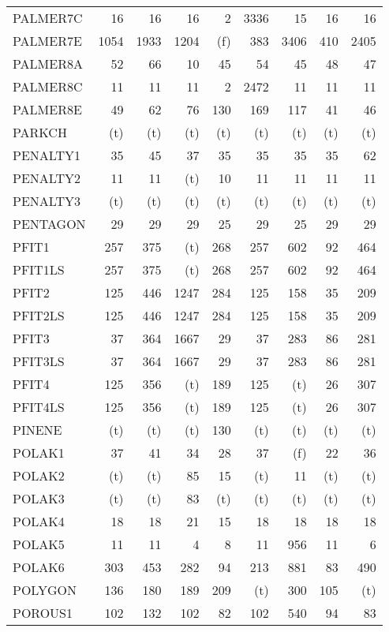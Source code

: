\documentclass[11pt,twoside]{article}
\begin{document}
{\begin{longtable}[c]{|l|r|r|r|r|r|r|r|r|}
 PALMER7C & 16 & 16 & 16 & 2 & 3336 & 15 & 16 & 16 \\
 PALMER7E & 1054 & 1933 & 1204 & (f) & 383 & 3406 & 410 & 2405 \\
 PALMER8A & 52 & 66 & 10 & 45 & 54 & 45 & 48 & 47 \\
 PALMER8C & 11 & 11 & 11 & 2 & 2472 & 11 & 11 & 11 \\
 PALMER8E & 49 & 62 & 76 & 130 & 169 & 117 & 41 & 46 \\
 PARKCH & (t) & (t) & (t) & (t) & (t) & (t) & (t) & (t) \\
 PENALTY1 & 35 & 45 & 37 & 35 & 35 & 35 & 35 & 62 \\
 PENALTY2 & 11 & 11 & (t) & 10 & 11 & 11 & 11 & 11 \\
 PENALTY3 & (t) & (t) & (t) & (t) & (t) & (t) & (t) & (t) \\
 PENTAGON & 29 & 29 & 29 & 25 & 29 & 25 & 29 & 29 \\
 PFIT1 & 257 & 375 & (t) & 268 & 257 & 602 & 92 & 464 \\
 PFIT1LS & 257 & 375 & (t) & 268 & 257 & 602 & 92 & 464 \\
 PFIT2 & 125 & 446 & 1247 & 284 & 125 & 158 & 35 & 209 \\
 PFIT2LS & 125 & 446 & 1247 & 284 & 125 & 158 & 35 & 209 \\
 PFIT3 & 37 & 364 & 1667 & 29 & 37 & 283 & 86 & 281 \\
 PFIT3LS & 37 & 364 & 1667 & 29 & 37 & 283 & 86 & 281 \\
 PFIT4 & 125 & 356 & (t) & 189 & 125 & (t) & 26 & 307 \\
 PFIT4LS & 125 & 356 & (t) & 189 & 125 & (t) & 26 & 307 \\
 PINENE & (t) & (t) & (t) & 130 & (t) & (t) & (t) & (t) \\
 POLAK1 & 37 & 41 & 34 & 28 & 37 & (f) & 22 & 36 \\
 POLAK2 & (t) & (t) & 85 & 15 & (t) & 11 & (t) & (t) \\
 POLAK3 & (t) & (t) & 83 & (t) & (t) & (t) & (t) & (t) \\
 POLAK4 & 18 & 18 & 21 & 15 & 18 & 18 & 18 & 18 \\
 POLAK5 & 11 & 11 & 4 & 8 & 11 & 956 & 11 & 6 \\
 POLAK6 & 303 & 453 & 282 & 94 & 213 & 881 & 83 & 490 \\
 POLYGON & 136 & 180 & 189 & 209 & (t) & 300 & 105 & (t) \\
 POROUS1 & 102 & 132 & 102 & 82 & 102 & 540 & 94 & 83 \\

\end{longtable}}
\end{document}
